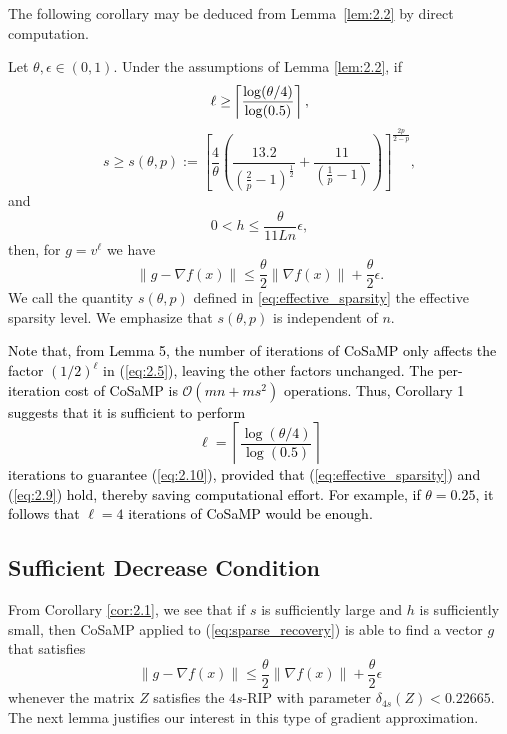 \noindent The following corollary may be deduced from Lemma~\ref{lem:2.2} by direct computation. 
\begin{corollary}
\label{cor:2.1}
Let $\theta,\epsilon\in (0,1)$. Under the assumptions of Lemma \ref{lem:2.2}, if 
\begin{equation}
\textcolor{black}{\ell\geq}\left\lceil\dfrac{\log(\theta/4)}{\log(0.5)}\right\rceil,
\label{eq:2.7}
\end{equation}
\begin{equation}
s\geq s(\theta,p):=\left[\frac{4}{\theta}\left(\frac{13.2}{\left(\frac{2}{p}-1\right)^{\frac{1}{2}}}+\frac{11}{\left(\frac{1}{p}-1\right)}\right)\right]^{\frac{2p}{2-p}} ,
\label{eq:effective_sparsity}
\end{equation}
and
\begin{equation}
0<h\leq\dfrac{\theta}{11 L n}\epsilon,
\label{eq:2.9}
\end{equation}
then, for $g=v^{\ell}$ we have
\begin{equation}
\|g-\nabla f(x)\|\leq\dfrac{\theta}{2}\|\nabla f(x)\|+\dfrac{\theta}{2}\epsilon.
\label{eq:2.10}
\end{equation}
We call the quantity $s(\theta,p)$ defined in \eqref{eq:effective_sparsity} the effective sparsity level. We emphasize that $s(\theta,p)$ is independent of $n$. 
\end{corollary}

\noindent \textcolor{black}{Note that, from Lemma 5, the number of iterations of CoSaMP only affects the factor \( (1/2)^{\ell} \) in (\ref{eq:2.5}), leaving the other factors unchanged. The per-iteration cost of CoSaMP is \( \mathcal{O}(mn + ms^2) \) operations. Thus, Corollary 1 suggests that it is sufficient to perform 
\begin{equation*}
\ell=\left\lceil\dfrac{\log(\theta/4)}{\log(0.5)}\right\rceil
\end{equation*}
iterations to guarantee (\ref{eq:2.10}), provided that (\ref{eq:effective_sparsity}) and (\ref{eq:2.9}) hold, thereby saving computational effort. For example, if $\theta=0.25$, it follows that $\ell=4$ iterations of CoSaMP would be enough.}




\subsection{Sufficient Decrease Condition}

From Corollary \ref{cor:2.1}, we see that if $s$ is sufficiently large and $h$ is sufficiently small, then CoSaMP applied to (\ref{eq:sparse_recovery}) is able to find a vector $g$ that satisfies 
\begin{equation}
\|g-\nabla f(x)\|\leq\dfrac{\theta}{2}\|\nabla f(x)\|+\dfrac{\theta}{2}\epsilon
\label{eq:2.11}
\end{equation}
whenever the matrix $Z$ satisfies the $4s$-RIP with parameter $\delta_{4s}(Z)<0.22665$. The next lemma justifies our interest in this type of gradient approximation.


